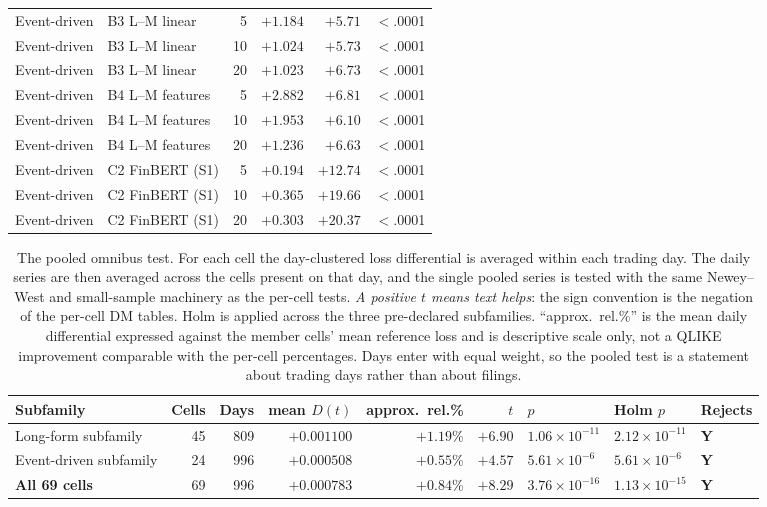 \begin{table}[p]
\begin{tabular}{@{}llrrrr@{}}
\addlinespace
Event-driven & B3 L--M linear & 5 & $+1.184$ & $+5.71$ & $<$.0001 \\
Event-driven & B3 L--M linear & 10 & $+1.024$ & $+5.73$ & $<$.0001 \\
Event-driven & B3 L--M linear & 20 & $+1.023$ & $+6.73$ & $<$.0001 \\
\addlinespace
Event-driven & B4 L--M features & 5 & $+2.882$ & $+6.81$ & $<$.0001 \\
Event-driven & B4 L--M features & 10 & $+1.953$ & $+6.10$ & $<$.0001 \\
Event-driven & B4 L--M features & 20 & $+1.236$ & $+6.63$ & $<$.0001 \\
\addlinespace
Event-driven & C2 FinBERT (S1) & 5 & $+0.194$ & $+12.74$ & $<$.0001 \\
Event-driven & C2 FinBERT (S1) & 10 & $+0.365$ & $+19.66$ & $<$.0001 \\
Event-driven & C2 FinBERT (S1) & 20 & $+0.303$ & $+20.37$ & $<$.0001 \\
\bottomrule
\end{tabular}
\end{table}

\begin{table}[htbp]
\centering
\caption[The pooled omnibus test over the 69-cell grid]{The pooled omnibus
test. For each cell the day-clustered loss differential is averaged within
each trading day. The daily series are then averaged across the cells
present on that day, and the single pooled series is tested with the same
Newey--West and small-sample machinery as the per-cell tests. \emph{A
positive $t$ means text helps}: the sign convention is the negation of
the per-cell DM tables. Holm is applied across the three
pre-declared subfamilies. ``approx.\ rel.\%'' is the mean daily
differential expressed against the member cells' mean reference loss and is
descriptive scale only, not a QLIKE improvement comparable with the
per-cell percentages. Days enter with equal weight, so the pooled test is a
statement about trading days rather than about filings.}
\label{tab:app-omnibus}
\singlespacing\footnotesize
\setlength{\tabcolsep}{3pt}
\begin{tabular}{@{}lrrrrrlll@{}}
\toprule
Subfamily & Cells & Days & mean $D(t)$ & approx.\ rel.\% & $t$ & $p$ & Holm $p$ & Rejects \\
\midrule
Long-form subfamily & 45 & 809 & $+0.001100$ & $+1.19$\% & $+6.90$ & $1.06\times10^{-11}$ & $2.12\times10^{-11}$ & \textbf{Y} \\
Event-driven subfamily & 24 & 996 & $+0.000508$ & $+0.55$\% & $+4.57$ & $5.61\times10^{-6}$ & $5.61\times10^{-6}$ & \textbf{Y} \\
\textbf{All 69 cells} & 69 & 996 & $+0.000783$ & $+0.84$\% & $+8.29$ & $3.76\times10^{-16}$ & $1.13\times10^{-15}$ & \textbf{Y} \\
\bottomrule
\end{tabular}
\end{table}

